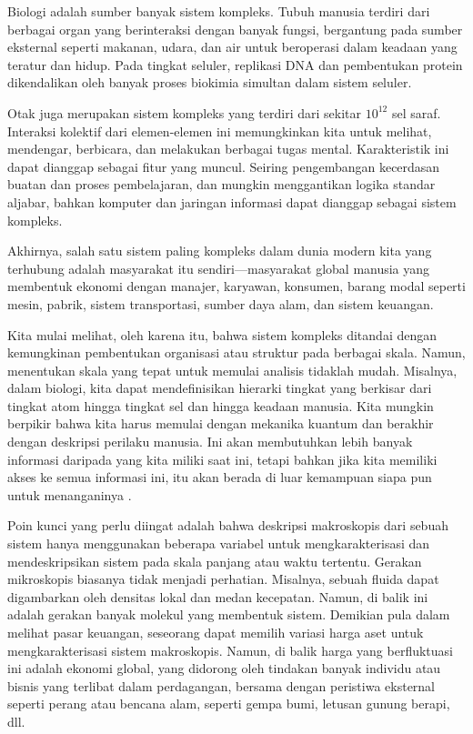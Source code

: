 \documentclass[a4paper,12pt]{book}
\begin{document}
Biologi adalah sumber banyak sistem kompleks. Tubuh manusia terdiri dari berbagai organ yang berinteraksi dengan banyak fungsi, bergantung pada sumber eksternal seperti makanan, udara, dan air untuk beroperasi dalam keadaan yang teratur dan hidup. Pada tingkat seluler, replikasi DNA dan pembentukan protein dikendalikan oleh banyak proses biokimia simultan dalam sistem seluler.

Otak juga merupakan sistem kompleks yang terdiri dari sekitar $10^{12}$ sel saraf. Interaksi kolektif dari elemen-elemen ini memungkinkan kita untuk melihat, mendengar, berbicara, dan melakukan berbagai tugas mental. Karakteristik ini dapat dianggap sebagai fitur yang muncul. Seiring pengembangan kecerdasan buatan dan proses pembelajaran, dan mungkin menggantikan logika standar aljabar, bahkan komputer dan jaringan informasi dapat dianggap sebagai sistem kompleks.

Akhirnya, salah satu sistem paling kompleks dalam dunia modern kita yang terhubung adalah masyarakat itu sendiri—masyarakat global manusia yang membentuk ekonomi dengan manajer, karyawan, konsumen, barang modal seperti mesin, pabrik, sistem transportasi, sumber daya alam, dan sistem keuangan.

Kita mulai melihat, oleh karena itu, bahwa sistem kompleks ditandai dengan kemungkinan pembentukan organisasi atau struktur pada berbagai skala. Namun, menentukan skala yang tepat untuk memulai analisis tidaklah mudah. Misalnya, dalam biologi, kita dapat mendefinisikan hierarki tingkat yang berkisar dari tingkat atom hingga tingkat sel dan hingga keadaan manusia. Kita mungkin berpikir bahwa kita harus memulai dengan mekanika kuantum dan berakhir dengan deskripsi perilaku manusia. Ini akan membutuhkan lebih banyak informasi daripada yang kita miliki saat ini, tetapi bahkan jika kita memiliki akses ke semua informasi ini, itu akan berada di luar kemampuan siapa pun untuk menanganinya \cite{andersen1972}.

Poin kunci yang perlu diingat adalah bahwa deskripsi makroskopis dari sebuah sistem hanya menggunakan beberapa variabel untuk mengkarakterisasi dan mendeskripsikan sistem pada skala panjang atau waktu tertentu. Gerakan mikroskopis biasanya tidak menjadi perhatian. Misalnya, sebuah fluida dapat digambarkan oleh densitas lokal dan medan kecepatan. Namun, di balik ini adalah gerakan banyak molekul yang membentuk sistem. Demikian pula dalam melihat pasar keuangan, seseorang dapat memilih variasi harga aset untuk mengkarakterisasi sistem makroskopis. Namun, di balik harga yang berfluktuasi ini adalah ekonomi global, yang didorong oleh tindakan banyak individu atau bisnis yang terlibat dalam perdagangan, bersama dengan peristiwa eksternal seperti perang atau bencana alam, seperti gempa bumi, letusan gunung berapi, dll.
\end{document}
